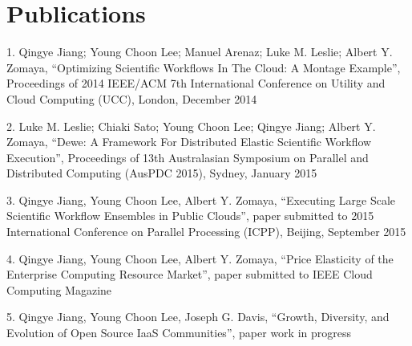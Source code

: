 \chapter{Publications}
\label{chapter:publications}


1.	Qingye Jiang; Young Choon Lee; Manuel Arenaz; Luke M. Leslie; Albert Y. Zomaya, ``Optimizing Scientific Workflows In The Cloud: A Montage Example'', Proceedings of 2014 IEEE/ACM 7th International Conference on Utility and Cloud Computing (UCC), London, December 2014

2.	Luke M. Leslie; Chiaki Sato; Young Choon Lee; Qingye Jiang; Albert Y. Zomaya, ``Dewe: A Framework For Distributed Elastic Scientific Workflow Execution'', Proceedings of 13th Australasian Symposium on Parallel and Distributed Computing (AusPDC 2015), Sydney, January 2015

3.	Qingye Jiang, Young Choon Lee, Albert Y. Zomaya, ``Executing Large Scale Scientific Workflow Ensembles in Public Clouds'', paper submitted to 2015 International Conference on Parallel Processing (ICPP), Beijing, September 2015

4.	Qingye Jiang, Young Choon Lee, Albert Y. Zomaya, ``Price Elasticity of the Enterprise Computing Resource Market'', paper submitted to IEEE Cloud Computing Magazine

5.	Qingye Jiang, Young Choon Lee, Joseph G. Davis, ``Growth, Diversity, and Evolution of Open Source IaaS Communities'', paper work in progress
